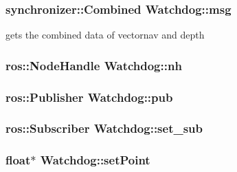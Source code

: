 \subsubsection[{\texorpdfstring{msg}{msg}}]{\setlength{\rightskip}{0pt plus 5cm}synchronizer\+::\+Combined Watchdog\+::msg}\hypertarget{classWatchdog_a5ecebf3cf248b17b31e66c70daf53fc2}{}\label{classWatchdog_a5ecebf3cf248b17b31e66c70daf53fc2}


gets the combined data of vectornav and depth 

\subsubsection[{\texorpdfstring{nh}{nh}}]{\setlength{\rightskip}{0pt plus 5cm}ros\+::\+Node\+Handle Watchdog\+::nh\hspace{0.3cm}{\ttfamily [private]}}\hypertarget{classWatchdog_a5e56a5d0f399c2afabe14bc9e4f96a8b}{}\label{classWatchdog_a5e56a5d0f399c2afabe14bc9e4f96a8b}
\subsubsection[{\texorpdfstring{pub}{pub}}]{\setlength{\rightskip}{0pt plus 5cm}ros\+::\+Publisher Watchdog\+::pub\hspace{0.3cm}{\ttfamily [private]}}\hypertarget{classWatchdog_ab57c2f5ba02206d982d885c65d1bad2c}{}\label{classWatchdog_ab57c2f5ba02206d982d885c65d1bad2c}
\subsubsection[{\texorpdfstring{set\+\_\+sub}{set_sub}}]{\setlength{\rightskip}{0pt plus 5cm}ros\+::\+Subscriber Watchdog\+::set\+\_\+sub\hspace{0.3cm}{\ttfamily [private]}}\hypertarget{classWatchdog_a23164f406d9d4b1418118da6b861e5dc}{}\label{classWatchdog_a23164f406d9d4b1418118da6b861e5dc}
\subsubsection[{\texorpdfstring{set\+Point}{setPoint}}]{\setlength{\rightskip}{0pt plus 5cm}float$\ast$ Watchdog\+::set\+Point\hspace{0.3cm}{\ttfamily [private]}}\hypertarget{classWatchdog_a4eacd86a0a265e25fda37e11be28eff2}{}\label{classWatchdog_a4eacd86a0a265e25fda37e11be28eff2}
